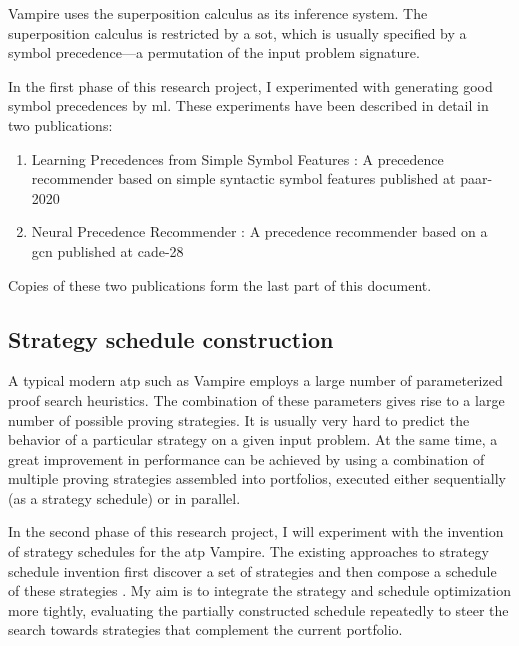 \documentclass{article}
\begin{document}
Vampire uses the superposition calculus \cite{DBLP:journals/logcom/BachmairG94,DBLP:books/el/RV01/NieuwenhuisR01} as its inference system.
The superposition calculus is restricted by a \gls{sot},
which is usually specified by a symbol precedence---a permutation of the input problem signature.

In the first phase of this research project, I experimented with generating good symbol precedences by \gls{ml}.
These experiments have been described in detail in two publications:
\begin{enumerate}
\item Learning Precedences from Simple Symbol Features \cite{DBLP:conf/cade/Bartek020}:
A precedence recommender based on simple syntactic symbol features published at \gls{paar-2020}
\item Neural Precedence Recommender \cite{DBLP:conf/cade/Bartek021}:
A precedence recommender based on a \gls{gcn} published at \gls{cade-28}
\end{enumerate}
Copies of these two publications form the last part of this document.

\subsection{Strategy schedule construction}

A typical modern \gls{atp} such as Vampire employs a large number of parameterized proof search heuristics.
The combination of these parameters gives rise to a large number of possible proving strategies.
It is usually very hard to predict the behavior of a particular strategy on a given input problem.
At the same time, a great improvement in performance can be achieved by using a combination of multiple proving strategies assembled into portfolios, executed either sequentially (as a strategy schedule) \cite{DBLP:conf/cade/Tammet98} or in parallel.

In the second phase of this research project, I will experiment with the invention of strategy schedules for the \gls{atp} Vampire.
The existing approaches to strategy schedule invention first discover a set of strategies and then compose a schedule of these strategies
\cite{DBLP:journals/jar/KuhlweinU15,DBLP:journals/aicom/JakubuvU18,DBLP:conf/mkm/HoldenK21}.
My aim is to integrate the strategy and schedule optimization more tightly,
evaluating the partially constructed schedule repeatedly
to steer the search towards strategies that complement the current portfolio.

\clearpage
\printbibliography



\end{document}
